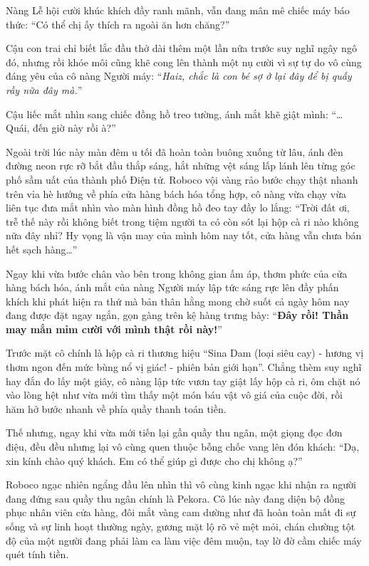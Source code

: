 \documentclass[../main.tex]{subfiles}
\begin{document}
Nàng Lễ hội cười khúc khích đầy ranh mãnh, vẫn đang mân mê chiếc máy báo thức: ``Có thể chị ấy thích ra ngoài ăn hơn chăng?''

Cậu con trai chỉ biết lắc đầu thở dài thêm một lần nữa trước suy nghĩ ngây ngô đó, nhưng rồi khóe môi cũng khẽ cong lên thành một nụ cười vì sự tự do vô cùng đáng yêu của cô nàng Người máy: ``\textit{Haiz, chắc là con bé sợ ở lại đây để bị quấy rầy nữa đây mà.}''

Cậu liếc mắt nhìn sang chiếc đồng hồ treo tường, ánh mắt khẽ giật mình: ``\dots Quái, đến giờ này rồi à?''

\ct

Ngoài trời lúc này màn đêm u tối đã hoàn toàn buông xuống từ lâu, ánh đèn đường neon rực rỡ bắt đầu thắp sáng, hắt những vệt sáng lấp lánh lên từng góc phố sầm uất của thành phố Điện tử. Roboco vội vàng rảo bước chạy thật nhanh trên vỉa hè hướng về phía cửa hàng bách hóa tổng hợp, cô nàng vừa chạy vừa liên tục đưa mắt nhìn vào màn hình đồng hồ đeo tay đầy lo lắng: ``Trời đất ơi, trễ thế này rồi không biết trong tiệm người ta có còn sót lại hộp cà ri nào không nữa đây nhỉ? Hy vọng là vận may của mình hôm nay tốt, cửa hàng vẫn chưa bán hết sạch hàng\dots''

Ngay khi vừa bước chân vào bên trong không gian ấm áp, thơm phức của cửa hàng bách hóa, ánh mắt của nàng Người máy lập tức sáng rực lên đầy phấn khích khi phát hiện ra thứ mà bản thân hằng mong chờ suốt cả ngày hôm nay đang được đặt ngay ngắn, gọn gàng trên kệ hàng trưng bày: ``\textbf{Đây rồi! Thần may mắn mỉm cười với mình thật rồi này!}''


Trước mặt cô chính là hộp cà ri thương hiệu ``Sina Dam (loại siêu cay) - hương vị thơm ngon đến mức bùng nổ vị giác! - phiên bản giới hạn''. Chẳng thèm suy nghĩ hay đắn đo lấy một giây, cô nàng lập tức vươn tay giật lấy hộp cà ri, ôm chặt nó vào lòng hệt như vừa mới tìm thấy một món báu vật vô giá của cuộc đời, rồi hăm hở bước nhanh về phía quầy thanh toán tiền.

Thế nhưng, ngay khi vừa mới tiến lại gần quầy thu ngân, một giọng đọc đơn điệu, đều đều nhưng lại vô cùng quen thuộc bỗng chốc vang lên đón khách: ``Dạ, xin kính chào quý khách. Em có thể giúp gì được cho chị không ạ?''

Roboco ngạc nhiên ngẩng đầu lên nhìn thì vô cùng kinh ngạc khi nhận ra người đang đứng sau quầy thu ngân chính là Pekora. Cô lúc này đang diện bộ đồng phục nhân viên cửa hàng, đôi mắt vàng cam dường như đã hoàn toàn mất đi sự sống và sự linh hoạt thường ngày, gương mặt lộ rõ vẻ mệt mỏi, chán chường tột độ của một người đang phải làm ca làm việc đêm muộn, tay lờ đờ cầm chiếc máy quét tính tiền.
\end{document}

